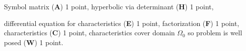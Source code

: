 \begin{bewertung}
\begin{teilaufgaben}
\item
Symbol matrix ({\bf A}) 1 point,
hyperbolic via determinant ({\bf H}) 1 point,
\item
differential equation for characteristics ({\bf E}) 1 point,
factorization ({\bf F}) 1 point,
characteristics ({\bf C}) 1 point,
characteristics cover domain $\Omega_0$ so problem is well posed ({\bf W})
1 point.
\end{teilaufgaben}
\end{bewertung}



